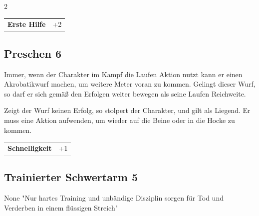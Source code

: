 \begin{multicols}{2}
\begin{tcolorbox}
\vspace{3mm}

\begin{tabular}{@{}ll@{}}
    \textbf{Erste Hilfe} & +2\\
\end{tabular}


\end{tcolorbox}

\begin{tcolorbox}
    \subsection*{Preschen \hfill \small{6 }}
    \tcblower
Immer, wenn der Charakter im Kampf die Laufen Aktion nutzt kann er einen Akrobatikwurf machen, um weitere Meter voran zu kommen. Gelingt dieser Wurf, so darf er sich gemäß den Erfolgen weiter bewegen als seine Laufen Reichweite. 

Zeigt der Wurf keinen Erfolg, so stolpert der Charakter, und gilt als Liegend. Er muss eine Aktion aufwenden, um wieder auf die Beine oder in die Hocke zu kommen.


\vspace{3mm}

\begin{tabular}{@{}ll@{}}
    \textbf{Schnelligkeit} & +1\\
\end{tabular}


\end{tcolorbox}

\begin{tcolorbox}
    \subsection*{Trainierter Schwertarm \hfill \small{5 }}
    \tcblower


\begin{pquote}{None}
"Nur hartes Training und unbändige Disziplin sorgen für Tod und Verderben in einem flüssigen Streich"
\end{pquote}


\end{tcolorbox}
\end{multicols}
